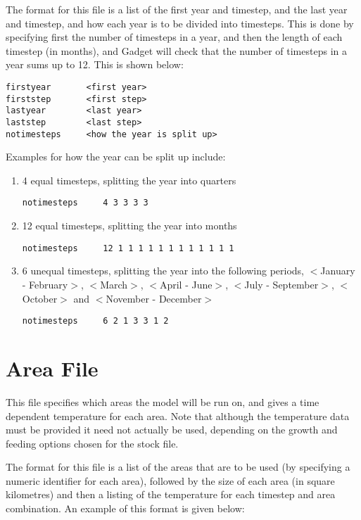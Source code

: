 \documentclass[10pt,twoside]{book}
\begin{document}
\bigskip
The format for this file is a list of the first year and timestep, and the last year and timestep, and how each year is to be divided into timesteps.  This is done by specifying first the number of timesteps in a year, and then the length of each timestep (in months), and Gadget will check that the number of timesteps in a year sums up to 12.  This is shown below:

{\small\begin{verbatim}
firstyear       <first year>
firststep       <first step>
lastyear        <last year>
laststep        <last step>
notimesteps     <how the year is split up>
\end{verbatim}}

Examples for how the year can be split up include:

\begin{enumerate}
\item 4 equal timesteps, splitting the year into quarters
{\small\begin{verbatim}
notimesteps     4 3 3 3 3
\end{verbatim}}
\item 12 equal timesteps, splitting the year into months
{\small\begin{verbatim}
notimesteps     12 1 1 1 1 1 1 1 1 1 1 1 1
\end{verbatim}}
\item 6 unequal timesteps, splitting the year into the following periods, $<$January - February$>$, $<$March$>$, $<$April - June$>$, $<$July - September$>$, $<$October$>$ and $<$November - December$>$
{\small\begin{verbatim}
notimesteps     6 2 1 3 3 1 2
\end{verbatim}}
\end{enumerate}

\section{Area File}\label{sec:areafile}
This file specifies which areas the model will be run on, and gives a time dependent temperature for each area.  Note that although the temperature data must be provided it need not actually be used, depending on the growth and feeding options chosen for the stock file.

\bigskip
The format for this file is a list of the areas that are to be used (by specifying a numeric identifier for each area), followed by the size of each area (in square kilometres) and then a listing of the temperature for each timestep and area combination.  An example of this format is given below:
\end{document}
